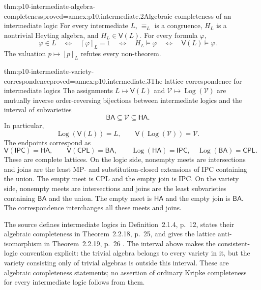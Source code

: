 \begin{hbtheorem}{thm:p10-intermediate-algebra-completeness}{proved=annex:p10.intermediate.2}{Algebraic completeness of an intermediate logic}
For every intermediate \(L\), \(\equiv_L\) is a congruence,
\(H_L\) is a nontrivial Heyting algebra, and \(H_L\in\mathsf V(L)\).
For every formula \(\varphi\),
\[
 \varphi\in L
 \quad\Longleftrightarrow\quad [\varphi]_L=1
 \quad\Longleftrightarrow\quad H_L\models\varphi
 \quad\Longleftrightarrow\quad\mathsf V(L)\models\varphi.
\]
The valuation \(p\mapsto[p]_L\) refutes every non-theorem.
\end{hbtheorem}

\begin{hbtheorem}{thm:p10-intermediate-variety-correspondence}{proved=annex:p10.intermediate.3}{The lattice correspondence for intermediate logics}
The assignments \(L\mapsto\mathsf V(L)\) and
\(\mathcal V\mapsto\operatorname{Log}(\mathcal V)\) are mutually
inverse order-reversing bijections between intermediate logics and
the interval of subvarieties
\[
 \mathsf{BA}\subseteq\mathcal V\subseteq\mathsf{HA}.
\]
In particular,
\[
 \operatorname{Log}(\mathsf V(L))=L,\qquad
 \mathsf V(\operatorname{Log}(\mathcal V))=\mathcal V.
\]
The endpoints correspond as
\[
 \mathsf V(\mathsf{IPC})=\mathsf{HA},\qquad
 \mathsf V(\mathsf{CPL})=\mathsf{BA},
 \qquad
 \operatorname{Log}(\mathsf{HA})=\mathsf{IPC},\quad
 \operatorname{Log}(\mathsf{BA})=\mathsf{CPL}.
\]
These are complete lattices.  On the logic side, nonempty meets are
intersections and joins are the least MP- and substitution-closed
extensions of IPC containing the union.  The empty meet is CPL and
the empty join is IPC.
On the variety side, nonempty meets are intersections and joins are
the least subvarieties containing \(\mathsf{BA}\) and the union.
The empty meet is \(\mathsf{HA}\) and the empty join is \(\mathsf{BA}\).
The correspondence interchanges all these meets and joins.
\end{hbtheorem}

The source defines intermediate logics in Definition~2.1.4, p.~12,
states their algebraic completeness in Theorem~2.2.18, p.~25, and
gives the lattice anti-isomorphism in Theorem~2.2.19, p.~26
\cite{Bezhanishvili2006Thesis}.
The interval above makes the consistent-logic convention explicit:
the trivial algebra belongs to every variety in it, but the variety
consisting only of trivial algebras is outside this interval.
These are algebraic completeness statements; no assertion of ordinary
Kripke completeness for every intermediate logic follows from them.
